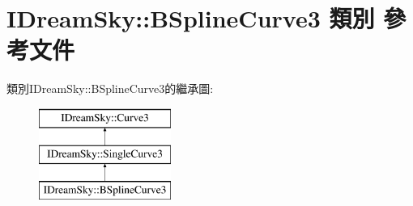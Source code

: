 \hypertarget{class_i_dream_sky_1_1_b_spline_curve3}{}\section{I\+Dream\+Sky\+:\+:B\+Spline\+Curve3 類別 參考文件}
\label{class_i_dream_sky_1_1_b_spline_curve3}
類別\+I\+Dream\+Sky\+:\+:B\+Spline\+Curve3的繼承圖\+:\begin{figure}[H]
\begin{center}
\leavevmode
\includegraphics[height=3.000000cm]{class_i_dream_sky_1_1_b_spline_curve3}
\end{center}
\end{figure}
